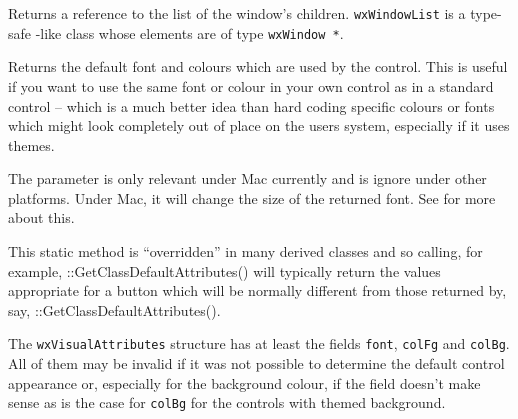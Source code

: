 \label{wxwindowgetchildren}



Returns a reference to the list of the window's children. \texttt{wxWindowList} 
is a type-safe -like class whose elements are of type
\texttt{wxWindow *}.


\label{wxwindowgetclassdefaultattributes}


Returns the default font and colours which are used by the control. This is
useful if you want to use the same font or colour in your own control as in a
standard control -- which is a much better idea than hard coding specific
colours or fonts which might look completely out of place on the users
system, especially if it uses themes.

The  parameter is only relevant under Mac currently and is
ignore under other platforms. Under Mac, it will change the size of the
returned font. See 
for more about this.

This static method is ``overridden'' in many derived classes and so calling,
for example, ::GetClassDefaultAttributes() will typically
return the values appropriate for a button which will be normally different
from those returned by, say, ::GetClassDefaultAttributes().

The \texttt{wxVisualAttributes} structure has at least the fields
\texttt{font}, \texttt{colFg} and \texttt{colBg}. All of them may be invalid
if it was not possible to determine the default control appearance or,
especially for the background colour, if the field doesn't make sense as is
the case for \texttt{colBg} for the controls with themed background.




\label{wxwindowgetclientsize}


